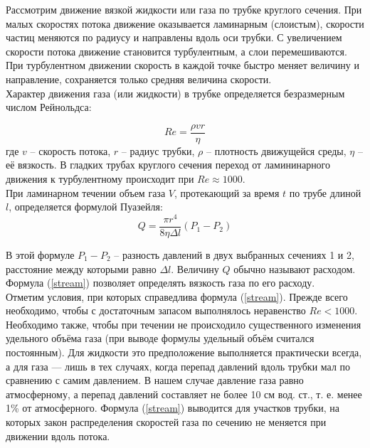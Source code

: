 \documentclass[a4paper, 12pt]{article}
\begin{document}
    \noindent Рассмотрим движение вязкой жидкости или газа по трубке круглого сечения. При малых скоростях потока движение оказывается ламинарным (слоистым), скорости частиц меняются по радиусу и направлены вдоль оси трубки. С увеличением скорости потока движение становится турбулентным, а слои перемешиваются. При турбулентном движении скорость в каждой точке быстро меняет величину и направление, сохраняется только средняя величина скорости. \\

    \noindent Характер движения газа (или жидкости) в трубке определяется безразмерным числом Рейнольдса:

    \begin{equation}
        \label{Re}
        Re = \frac{\rho vr}{\eta}
    \end{equation}
    \noindent где $v$ -- скорость потока, $r$ -- радиус трубки, $\rho$ -- плотность движущейся среды, $\eta$ -- её вязкость. В гладких трубах круглого сечения переход от ламининарного движения к турбулентному происходит при $Re \approx 1000$. \\

    \noindent При ламинарном течении объем газа $V$, протекающий за время $t$ по трубе длиной $l$, определяется формулой Пуазейля:
    \begin{equation}
        \label{stream}
	Q = \frac{\pi r^4}{8 \eta \Delta l}(P_1 - P_2)
    \end{equation}
    
    \noindent В этой формуле $P_1 - P_2$ -- разность давлений в двух выбранных сечениях 1 и 2, расстояние между которыми равно $\Delta l$. Величину $Q$ обычно называют расходом. Формула (\ref{stream}) позволяет определять вязкость газа по его расходу. \\

    \noindent Отметим условия, при которых справедлива формула (\ref{stream}). Прежде всего необходимо, чтобы с достаточным запасом выполнялось неравенство $Re < 1000$. Необходимо также, чтобы при течении не происходило существенного изменения удельного объёма газа (при выводе формулы удельный объём считался постоянным). Для жидкости это предположение выполняется практически всегда, а для газа --- лишь в тех случаях, когда перепад давлений вдоль трубки мал по сравнению с самим давлением. В нашем случае давление газа равно атмосферному, а перепад давлений составляет не более 10 см вод. ст., т. е. менее 1\% от атмосферного. Формула (\ref{stream}) выводится для участков трубки, на которых закон распределения скоростей газа по сечению не меняется при движении вдоль потока.
    
\end{document}
